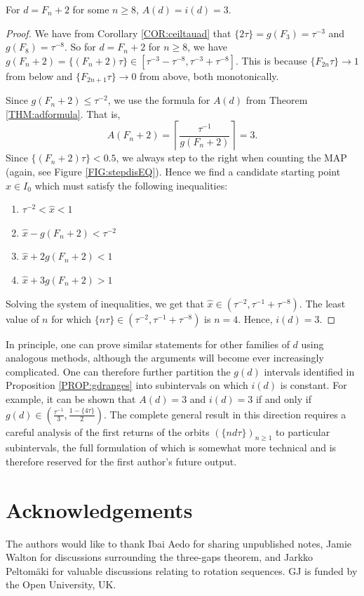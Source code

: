 \documentclass[10pt,a4paper,reqno]{amsart}
\begin{document}
\begin{prop}\label{PROP:ad3id3}
For $d=F_n+2$ for some $n\geq8$, $A(d)=i(d)=3$.
\end{prop}
\begin{proof}
We have from Corollary \ref{COR:ceiltauad} that $\{ 2\tau \} = g(F_3)=\tau^{-3}$ and $g(F_8)=\tau^{-8}$. So for $d=F_n+2$ for $n\geq8$, we have $g(F_n+2)=\{ (F_n+2)\tau\} \in [\tau^{-3}-\tau^{-8},\tau^{-3}+\tau^{-8}]$. This is because $\{ F_{2n}\tau \}\to1$ from below and $\{ F_{2n+1}\tau \}\to0$ from above, both monotonically. 

Since $g(F_n+2)\leq\tau^{-2}$, we use the formula for $A(d)$ from Theorem \ref{THM:adformula}. That is,
\[A(F_n+2) =\left\lceil\frac{\tau^{-1}}{g(F_n+2)}\right\rceil = 3.\]
Since $\{ (F_n+2)\tau\}<0.5$, we always step to the right when counting the MAP (again, see Figure \ref{FIG:stepdisEQ}). Hence we find a candidate starting point $\hat{x}\in I_0$ which must satisfy the following inequalities:
\begin{enumerate}
\item[(i)] $\tau^{-2}<\hat{x}<1$
\item[(ii)] $\hat{x}-g(F_n+2)<\tau^{-2}$
\item[(iii)] $\hat{x}+2g(F_n+2)<1$
\item[(iv)] $\hat{x}+3g(F_n+2)>1$
\end{enumerate}
Solving the system of inequalities, we get that $\hat{x}\in(\tau^{-2},\tau^{-1}+\tau^{-8})$. The least value of $n$ for which $\{ n\tau \} \in (\tau^{-2},\tau^{-1}+\tau^{-8})$ is $n=4$. Hence, $i(d)=3$.
\end{proof}
In principle, one can prove similar statements for other families of $d$ using analogous methods, although the arguments will become ever increasingly complicated. One can therefore further partition the $g(d)$ intervals identified in Proposition \ref{PROP:gdranges} into subintervals on which $i(d)$ is constant. For example, it can be shown that $A(d)=3$ and $i(d)=3$ if and only if $g(d)\in\left(\frac{\tau^{-1}}{3},\frac{1-\{ 4\tau\}}{2}\right)$. The complete general result in this direction requires a careful analysis of the first returns of the orbits $(\{nd\tau\})_{n \geq 1}$ to particular subintervals, the full formulation of which is somewhat more technical and is therefore reserved for the first author's future output.



\section*{Acknowledgements}
The authors would like to thank Ibai Aedo for sharing unpublished notes, Jamie Walton for discussions surrounding the three-gaps theorem, and Jarkko Peltom\"aki for valuable discussions relating to rotation sequences. GJ is funded by the Open University, UK.
\end{document}
